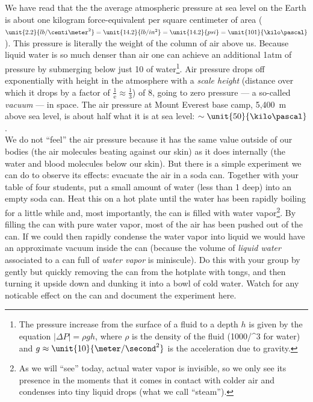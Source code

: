 We have read that the the average atmospheric pressure at sea level on the Earth is about one kilogram force-equivalent per square centimeter of area ($\unit{2.2}{lb/\centi\meter^2} = \unit{14.2}{lb/in^2} = \unit{14.2}{psi} = \unit{101}{\kilo\pascal}$). This pressure is literally the weight of the column of air above us. Because liquid water is so much denser than air one can achieve an additional \unit{1}{atm} of pressure by submerging below just \unit{10}{\meter} of water\footnote{The pressure increase from the surface of a fluid to a depth $h$ is given by the equation $|\Delta P| = \rho g h$, where $\rho$ is the density of the fluid (\unit{1000}{\kilo\gram/\meter^3} for water) and $g \approx \unit{10}{\meter/\second^2}$ is the acceleration due to gravity.}.  Air pressure drops off exponentially with height in the atmosphere  with a {\em scale height} (distance over which it drops by a factor of $\frac{1}{\text{e}} \approx \frac{1}{3}$) of \unit{8}{\kilo\meter}, going to zero pressure --- a so-called {\em vacuum} --- in space.  The air pressure at Mount Everest base camp, 5,400~m above sea level, is about half what it is at sea level: $\sim \unit{50}{\kilo\pascal}$.\\[-6pt] 

 We do not ``feel'' the air pressure because it has the same value outside of our bodies (the air molecules beating against our skin) as it does internally (the water and blood molecules below our skin).  But there is a simple experiment we can do to observe its effects: evacuate the air in a soda can.  Together with your table of four students, put a small amount of water (less than  \unit{1}{\centi\meter} deep) into an empty soda can.  Heat this on a hot plate until the water has been rapidly boiling for a little while and, most importantly, the can is filled with water vapor\footnote{As we will ``see'' today, actual water vapor is invisible, so we only see its presence in the moments that it comes in contact with colder air and condenses into tiny liquid drops (what we call ``steam'').}.  By filling the can with pure water vapor, most of the air has been pushed out of the can.  If we could then rapidly condense the water vapor into liquid we would have an approximate vacuum inside the can (because the volume of {\em liquid water} associated to a can full of {\em water vapor} is miniscule).  Do this with your group by gently but quickly removing the can from the hotplate with tongs, and then turning it upside down and dunking it into a bowl of cold water.  Watch for any noticable effect on the can and document the experiment here.

